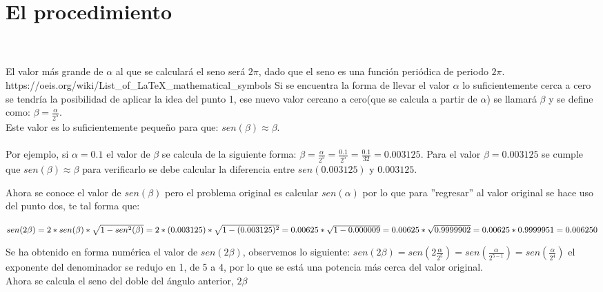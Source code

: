 \documentclass[letter,12pt]{article}
\newcommand{\Enmarca}[1]{{\centering\fbox{#1}\par}}
\begin{document}
\pagebreak
\section*{El procedimiento}

\\\\
\ifx
El valor más grande de $\alpha$ al que se calculará el seno será $2\pi$, dado que el seno es una función periódica de periodo $2\pi$.\fi 
\ifx
https://oeis.org/wiki/List_of_LaTeX_mathematical_symbols
\fi
Si se encuentra la forma de llevar el valor $\alpha$ lo suficientemente cerca a cero se tendría la posibilidad de aplicar la idea del punto 1, ese nuevo valor cercano a cero(que se calcula a partir de $\alpha$) se llamará $\beta$ y se define como: 
$\beta=\frac{\alpha}{2^{5}}$.\\
Este valor es lo suficientemente pequeño para que: $sen(\beta)\approx\beta$. 
\\\\
Por ejemplo, si $\alpha=0.1$ el valor de $\beta$ se calcula de la siguiente forma: $\beta=\frac{\alpha}{2^{5}}=\frac{0.1}{2^{5}}=\frac{0.1}{32}=0.003125$. Para el valor $\beta=0.003125$ se cumple que $sen(\beta)\approx\beta$ para verificarlo se debe calcular la diferencia entre $sen(0.003125)$ y $0.003125$.


{
\centering
{}\par
}

Ahora se conoce el valor de $sen(\beta)$ pero el problema original es calcular $sen(\alpha)$ por lo que para ''regresar'' al valor original se hace uso del punto dos, te tal forma que:

$sen(2\beta)=2*sen(\beta)*\sqrt{1-sen^2(\beta)}=\\
2*(0.003125)*\sqrt{1-(0.003125)^2}=\\
0.00625*\sqrt{1-0.000009}=\\
0.00625*\sqrt{0.9999902}=\\
0.00625*0.9999951=0.006250$

\Enmarca{$sen(2\beta)=0.006250$}

Se ha obtenido en forma numérica el valor de $sen(2\beta)$, observemos lo siguiente:
$sen(2\beta)=sen(2\frac{\alpha}{2^{5}})=sen(\frac{\alpha}{2^{5-1}})=sen(\frac{\alpha}{2^{4}})$ el exponente del denominador se redujo en 1, de 5 a 4, por lo que se está una potencia más cerca del valor original. \\
Ahora se calcula el seno del doble del ángulo anterior, $2\beta$
\end{document}
